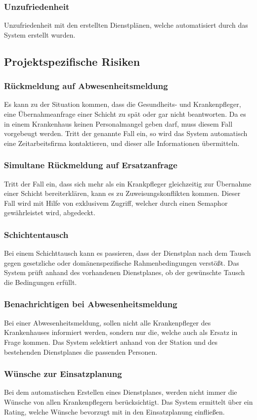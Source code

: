 \documentclass[10pt,a4paper]{article}
\begin{document}
\subsubsection{Unzufriedenheit}
Unzufriedenheit mit den erstellten Dienstplänen, welche automatisiert durch das System erstellt wurden.
\subsection{Projektspezifische Risiken}
\subsubsection{Rückmeldung auf Abwesenheitsmeldung}
Es kann zu der Situation kommen, dass die Gesundheits- und Krankenpfleger, eine Übernahmeanfrage einer Schicht zu spät oder gar nicht beantworten. Da es in einem Krankenhaus keinen Personalmangel geben darf, muss diesem Fall vorgebeugt werden. Tritt der genannte Fall ein, so wird das System automatisch eine Zeitarbeitsfirma kontaktieren, und dieser alle Informationen übermitteln.
\subsubsection{Simultane Rückmeldung auf Ersatzanfrage}
Tritt der Fall ein, dass sich mehr als ein Krankpfleger gleichzeitig zur Übernahme einer Schicht bereiterklären, kann es zu Zuweisungskonflikten kommen. Dieser Fall wird mit Hilfe von exklusivem Zugriff, welcher durch einen Semaphor gewährleistet wird, abgedeckt.
\subsubsection{Schichtentausch}
Bei einem Schichttausch kann es passieren, dass der Dienstplan nach dem Tausch gegen gesetzliche oder domänenspezifische Rahmenbedingungen verstößt. Das System prüft anhand des vorhandenen Dienstplanes, ob der gewünschte Tausch die Bedingungen erfüllt.
\subsubsection{Benachrichtigen bei Abwesenheitsmeldung}
Bei einer Abwesenheitsmeldung, sollen nicht alle Krankenpfleger des Krankenhauses informiert werden, sondern nur die, welche auch als Ersatz in Frage kommen. Das System selektiert anhand von der Station und des bestehenden Dienstplanes die passenden Personen.
\subsubsection{Wünsche zur Einsatzplanung}
Bei dem automatischen Erstellen eines Dienstplanes, werden nicht immer die Wünsche von allen Krankenpflegern berücksichtigt. Das System ermittelt über ein Rating, welche Wünsche bevorzugt mit in den Einsatzplanung einfließen.
\end{document}

